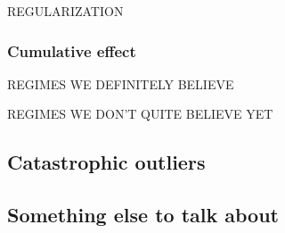 REGULARIZATION

\subsubsection{Cumulative effect}
REGIMES WE DEFINITELY BELIEVE

REGIMES WE DON'T QUITE BELIEVE YET

\subsection{Catastrophic outliers}
\label{sec:discussion-catastrophic}

\subsection{Something else to talk about}